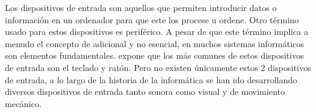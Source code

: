 Los dispositivos de entrada son aquellos que permiten introducir datos o informaci\'on en un ordenador para que este los procese u ordene. Otro t\'ermino usado para estos dispositivos es perif\'erico. A pesar de que este t\'ermino implica a menudo el concepto de adicional y no esencial, en muchos sistemas inform\'aticos son elementos fundamentales. \cite{entradasalida} expone que los m\'as comunes de estos dispositivos de entrada son el teclado y rat\'on. Pero no existen \'unicamente estos 2 dispositivos de entrada, a lo largo de la historia de la inform\'atica se han ido desarrollando diversos dispositivos de entrada tanto sonora como visual y de movimiento mec\'anico.\\



